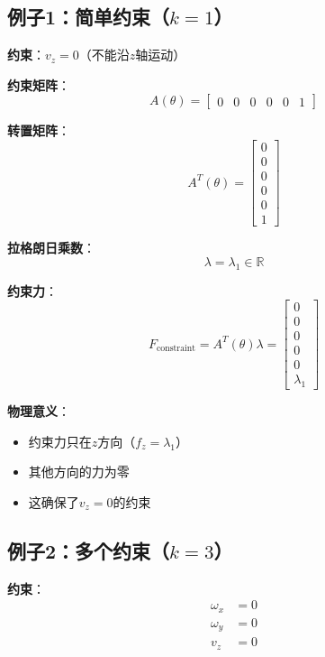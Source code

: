 \documentclass[12pt,a4paper]{article}
\begin{document}
\subsection{例子1：简单约束（$k = 1$）}

\textbf{约束}：$v_z = 0$（不能沿$z$轴运动）

\textbf{约束矩阵}：
\begin{equation}
A(\theta) = \begin{bmatrix} 0 & 0 & 0 & 0 & 0 & 1 \end{bmatrix}
\end{equation}

\textbf{转置矩阵}：
\begin{equation}
A^T(\theta) = \begin{bmatrix} 0 \\ 0 \\ 0 \\ 0 \\ 0 \\ 1 \end{bmatrix}
\end{equation}

\textbf{拉格朗日乘数}：
\begin{equation}
\lambda = \lambda_1 \in \mathbb{R}
\end{equation}

\textbf{约束力}：
\begin{equation}
F_{\text{constraint}} = A^T(\theta)\lambda = \begin{bmatrix} 0 \\ 0 \\ 0 \\ 0 \\ 0 \\ \lambda_1 \end{bmatrix}
\end{equation}

\textbf{物理意义}：
\begin{itemize}
\item 约束力只在$z$方向（$f_z = \lambda_1$）
\item 其他方向的力为零
\item 这确保了$v_z = 0$的约束
\end{itemize}

\subsection{例子2：多个约束（$k = 3$）}

\textbf{约束}：
\begin{align}
\omega_x &= 0 \\
\omega_y &= 0 \\
v_z &= 0
\end{align}
\end{document}
